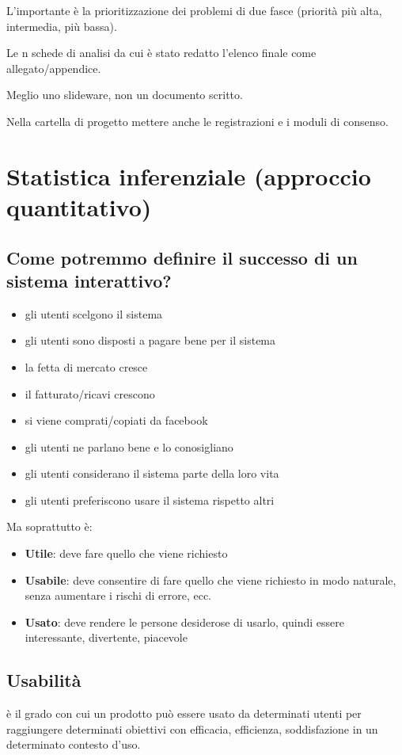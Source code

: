 \documentclass[11pt,a4paper]{book}
\begin{document}
L'importante è la prioritizzazione dei problemi di due fasce (priorità più alta, intermedia, più bassa).

Le n schede di analisi da cui è stato redatto l'elenco finale come allegato/appendice.

Meglio uno slideware, non un documento scritto.

Nella cartella di progetto mettere anche le registrazioni e i moduli di consenso.

\section{Statistica  inferenziale (approccio quantitativo)}
\subsection{Come potremmo definire il successo di un sistema interattivo?}
\begin{itemize}
	\item gli utenti scelgono il sistema
	\item gli utenti sono disposti a pagare bene per il sistema
	\item la fetta di mercato cresce
	\item il fatturato/ricavi crescono
	\item si viene comprati/copiati da facebook
	\item gli utenti ne parlano bene e lo conosigliano
	\item gli utenti considerano il sistema parte della loro vita
	\item gli utenti preferiscono usare il sistema rispetto altri
\end{itemize}

Ma soprattutto è:
\begin{itemize}
	\item \textbf{Utile}: deve fare quello che viene richiesto
	\item \textbf{Usabile}: deve consentire di fare quello che viene richiesto in modo naturale, senza aumentare i rischi di errore, ecc.
	\item \textbf{Usato}: deve rendere le persone desiderose di usarlo, quindi essere interessante, divertente, piacevole
\end{itemize}

\subsection{Usabilità}
è il grado con cui un prodotto può essere usato da determinati utenti per raggiungere determinati obiettivi con efficacia, efficienza, soddisfazione in un determinato contesto d'uso.
\end{document}
